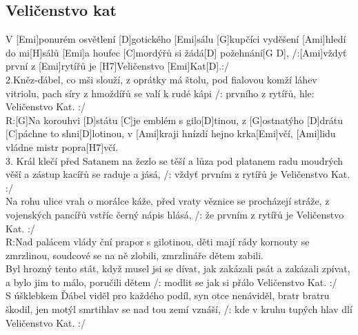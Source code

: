 \documentclass[10pt]{article}
\begin{document}
\begin{Large}
\begin{minipage}{\textwidth}
\subsection{Veličenstvo kat}
\begin{multicols}{2}
\begin{guitar}
	V [Emi]ponurém osvětlení [D]gotického [Emi]sálu
	[G]kupčíci vyděšení [Ami]hledí do mi[H]sálů
	[Emi]a houfec [C]mordýřů si žádá[D] požehnání[G D],
	/:[Ami]vždyť první z [Emi]rytířů je [H7]Veličenstvo [Emi]Kat[D].:/
	\\
	2.Kněz-ďábel, co mši slouží, z oprátky má 
	štolu,
	pod fialovou komží láhev vitriolu,
	pach síry z hmoždířů se valí k rudé kápi
	/: prvního z rytířů, hle: Veličenstvo Kat. :/
	\\
	R:[G]Na korouhvi [D]státu [C]je emblém s gilo[D]tinou,
	z [G]ostnatýho [D]drátu [C]páchne to shni[D]lotinou,
	v [Ami]kraji hnízdí hejno krka[Emi]včí,
	[Ami]lidu vládne mistr popra[H7]včí.
	\\
	3. Král klečí před Satanem na žezlo se těší
	a lůza pod platanem radu moudrých věší
	a zástup kacířů se raduje a jásá,
	/: vždyť prvním z rytířů je Veličenstvo Kat. :/
	\\
	Na rohu ulice vrah o morálce káže,
	před vraty věznice se procházejí stráže,
	z vojenských pancířů vstříc černý nápis 
	hlásá,
	/: že prvním z rytířů je Veličenstvo Kat. :/
	\\
	R:Nad palácem vlády ční prapor s gilotinou,
	děti mají rády kornouty se zmrzlinou,
	soudcové se na ně zlobili,
	zmrzlináře dětem zabili.
	\\
	Byl hrozný tento stát, 
	když musel jsi se dívat,
	jak zakázali psát a zakázali zpívat,
	a bylo jim to málo, poručili dětem
	/: modlit se jak si přálo Veličenstvo Kat. :/
	\\
	S úšklebkem Ďábel viděl pro každého podíl,
	syn otce nenáviděl, bratr bratru škodil,
	jen motýl smrtihlav se nad tou zemí vznáší,
	/: kde v kruhu tupých hlav dlí Veličenstvo Kat. :/
\end{guitar}
\end{multicols}
\end{minipage}

\begin{minipage}{\textwidth}

\end{minipage}
\end{Large}
\end{document}
